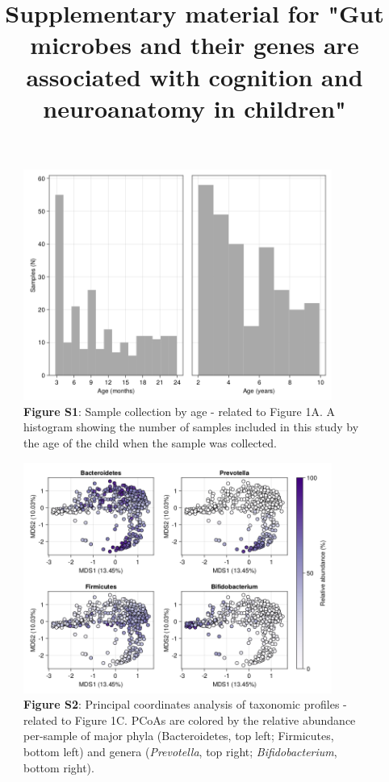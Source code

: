 \documentclass{article}
\title{Supplementary material for "Gut microbes and their genes are associated with cognition and neuroanatomy in children"}
\begin{document}
\baselineskip24pt

\maketitle

\begin{figure}[h]
    \centering
    \includegraphics[width=0.9\textwidth]{assets/Supp_Figure1.png}
    \captionsetup{labelformat=empty}
    \caption{
        \textbf{Figure S1}: Sample collection by age - related to Figure 1A. A histogram showing the number of samples
        included in this study by the age of the child when the sample was collected.
    }
\end{figure}

\begin{figure}[h]
    \centering
    \includegraphics[width=0.9\textwidth]{assets/Supp_Figure2.png}
    \captionsetup{labelformat=empty}
    \caption{
        \textbf{Figure S2}: Principal coordinates analysis of taxonomic profiles - 
        related to Figure 1C. PCoAs are colored by the relative abundance per-sample
        of major phyla (Bacteroidetes, top left; Firmicutes, bottom left)
        and genera (\textit{Prevotella}, top right; \textit{Bifidobacterium}, bottom right).
    }
\end{figure}
\end{document}
